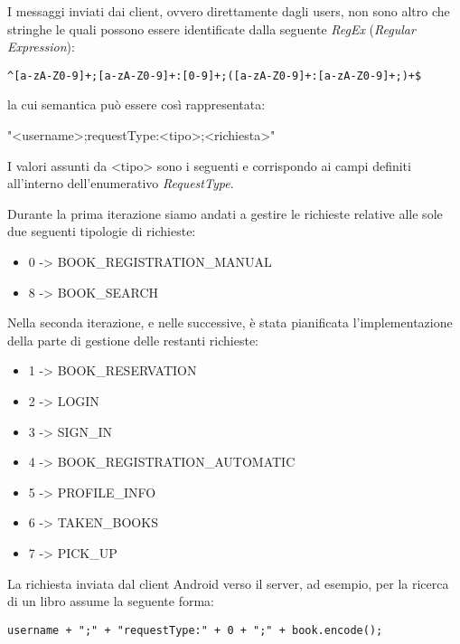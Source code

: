 I messaggi inviati dai client, ovvero direttamente dagli users, non sono altro che stringhe le quali possono essere identificate dalla seguente \textit{RegEx} (\textit{Regular Expression}): 

\begin{lstlisting}[caption={\textit{RegEx} utilizzata},captionpos=b]
	^[a-zA-Z0-9]+;[a-zA-Z0-9]+:[0-9]+;([a-zA-Z0-9]+:[a-zA-Z0-9]+;)+$
\end{lstlisting}

la cui semantica può essere così rappresentata:

\begin{center}
"<username>;requestType:<tipo>;<richiesta>"
\end{center}

I valori assunti da <tipo> sono i seguenti e corrispondo ai campi definiti all'interno dell'enumerativo \textit{RequestType}.

Durante la prima iterazione siamo andati a gestire le richieste relative alle sole due seguenti tipologie di richieste:
\begin{itemize}
	\item 0 -> BOOK\_REGISTRATION\_MANUAL
	\item 8 -> BOOK\_SEARCH
\end{itemize}

Nella seconda iterazione, e nelle successive, è stata pianificata l'implementazione della parte di gestione delle restanti richieste:

\begin{itemize}
	\item 1 -> BOOK\_RESERVATION	
	\item 2 -> LOGIN
	\item 3 -> SIGN\_IN
	\item 4 -> BOOK\_REGISTRATION\_AUTOMATIC
	\item 5 -> PROFILE\_INFO
	\item 6 -> TAKEN\_BOOKS
	\item 7 -> PICK\_UP	
\end{itemize}
La richiesta inviata dal client Android verso il server, ad esempio, per la ricerca di un libro assume la seguente forma:

\begin{lstlisting}[caption={Semantica della richiesta per ricerca},captionpos=b]
	username + ";" + "requestType:" + 0 + ";" + book.encode();
\end{lstlisting}

